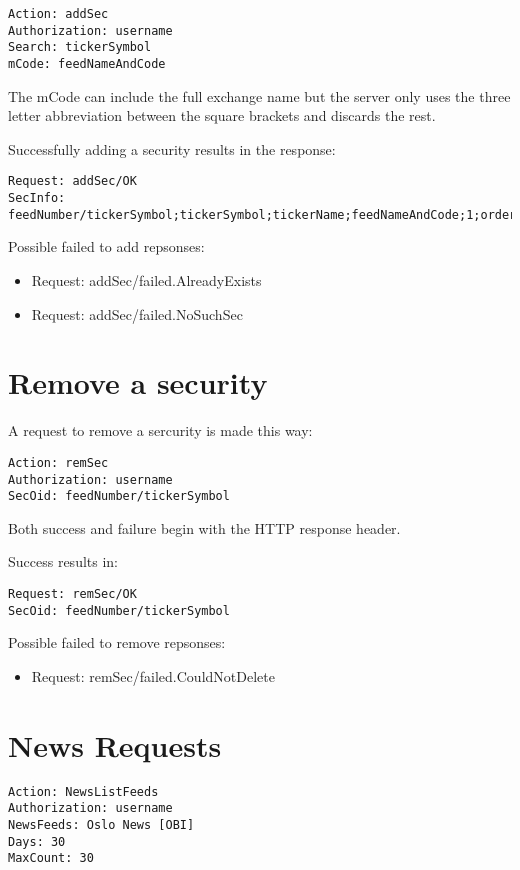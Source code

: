 \documentclass[12pt,twoside,letterpaper]{report}
\begin{document}
\begin{verbatim}
Action: addSec
Authorization: username
Search: tickerSymbol
mCode: feedNameAndCode
\end{verbatim}

The mCode can include the full exchange name but the server only uses the three letter abbreviation between the square brackets and discards the rest.

Successfully adding a security results in the response: 
\begin{lstlisting}
Request: addSec/OK
SecInfo: feedNumber/tickerSymbol;tickerSymbol;tickerName;feedNameAndCode;1;orderBook;ISIN;tickerExchangeCode
\end{lstlisting}

Possible failed to add repsonses:
\begin{itemize}
\item Request: addSec/failed.AlreadyExists
\item Request: addSec/failed.NoSuchSec
\end{itemize}

\section*{Remove a security}

A request to remove a sercurity is made this way:
\begin{verbatim}
Action: remSec
Authorization: username
SecOid: feedNumber/tickerSymbol
\end{verbatim}

Both success and failure begin with the HTTP response header.

Success results in:
\begin{verbatim}
Request: remSec/OK
SecOid: feedNumber/tickerSymbol
\end{verbatim}

Possible failed to remove repsonses:
\begin{itemize}
\item Request: remSec/failed.CouldNotDelete
\end{itemize}

\section*{News Requests}
\begin{verbatim}
Action: NewsListFeeds
Authorization: username
NewsFeeds: Oslo News [OBI]
Days: 30
MaxCount: 30
\end{verbatim}
\end{document}

